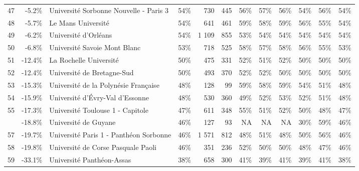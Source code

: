 \documentclass[11pt,french,landscape]{article}
\begin{document}
\begin{longtable}{rrlrrrrrrlrr}
\rowcolor{gray!6}  47 & -5.2\% & Université Sorbonne Nouvelle - Paris 3 & 54\% & 730 & 445 & 56\% & 57\% & 56\% & 54\% & 56\% & 54\%\\
48 & -5.7\% & Le Mans Université & 54\% & 641 & 461 & 59\% & 58\% & 59\% & 56\% & 55\% & 54\%\\
\rowcolor{gray!6}  49 & -6.2\% & Université d'Orléans & 54\% & 1 109 & 855 & 53\% & 54\% & 54\% & 54\% & 54\% & 54\%\\
50 & -6.8\% & Université Savoie Mont Blanc & 53\% & 718 & 525 & 58\% & 57\% & 58\% & 56\% & 55\% & 53\%\\
\addlinespace
\rowcolor{gray!6}  51 & -12.4\% & La Rochelle Université & 50\% & 475 & 331 & 52\% & 51\% & 52\% & 50\% & 50\% & 50\%\\
52 & -12.4\% & Université de Bretagne-Sud & 50\% & 493 & 370 & 52\% & 52\% & 50\% & 50\% & 50\% & 50\%\\
\rowcolor{gray!6}  53 & -15.3\% & Université de la Polynésie Française & 48\% & 128 & 99 & 59\% & 58\% & 59\% & 54\% & 51\% & 48\%\\
54 & -15.9\% & Université d'Évry-Val d'Essonne & 48\% & 530 & 360 & 49\% & 52\% & 53\% & 52\% & 51\% & 48\%\\
\rowcolor{gray!6}  55 & -17.3\% & Université Toulouse 1 - Capitole & 47\% & 611 & 348 & 55\% & 51\% & 52\% & 50\% & 48\% & 47\%\\
\addlinespace
56 & -18.8\% & Université de Guyane & 46\% & 127 & 93 & NA & NA & NA & 30\% & 59\% & 46\%\\
\rowcolor{gray!6}  57 & -19.7\% & Université Paris 1 - Panthéon Sorbonne & 46\% & 1 571 & 812 & 48\% & 51\% & 48\% & 50\% & 56\% & 46\%\\
58 & -19.8\% & Université de Corse Pasquale Paoli & 46\% & 351 & 236 & 52\% & 50\% & 50\% & 48\% & 47\% & 46\%\\
\rowcolor{gray!6}  59 & -33.1\% & Université Panthéon-Assas & 38\% & 658 & 300 & 41\% & 39\% & 41\% & 39\% & 41\% & 38\%\\*
\end{longtable}
\end{document}
